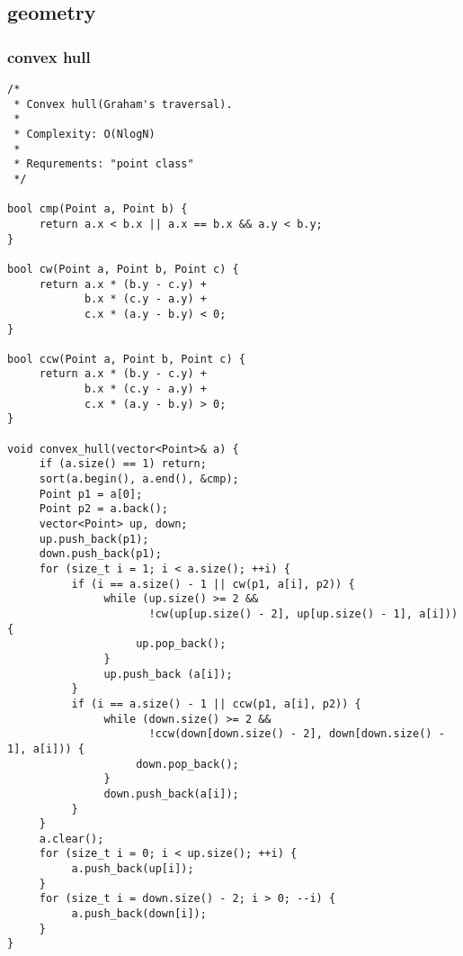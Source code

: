 \subsection{geometry}
\subsubsection{convex hull}
\begin{lstlisting}
/*
 * Convex hull(Graham's traversal).
 *
 * Complexity: O(NlogN)
 *
 * Requrements: "point class"
 */

bool cmp(Point a, Point b) {
     return a.x < b.x || a.x == b.x && a.y < b.y;
}

bool cw(Point a, Point b, Point c) {
     return a.x * (b.y - c.y) +
            b.x * (c.y - a.y) +
            c.x * (a.y - b.y) < 0;
}

bool ccw(Point a, Point b, Point c) {
     return a.x * (b.y - c.y) +
            b.x * (c.y - a.y) +
            c.x * (a.y - b.y) > 0;
}

void convex_hull(vector<Point>& a) {
     if (a.size() == 1) return;
     sort(a.begin(), a.end(), &cmp);
     Point p1 = a[0];
     Point p2 = a.back();
     vector<Point> up, down;
     up.push_back(p1);
     down.push_back(p1);
     for (size_t i = 1; i < a.size(); ++i) {
          if (i == a.size() - 1 || cw(p1, a[i], p2)) {
               while (up.size() >= 2 &&
                      !cw(up[up.size() - 2], up[up.size() - 1], a[i])) {
                    up.pop_back();
               }
               up.push_back (a[i]);
          }
          if (i == a.size() - 1 || ccw(p1, a[i], p2)) {
               while (down.size() >= 2 &&
                      !ccw(down[down.size() - 2], down[down.size() - 1], a[i])) {
                    down.pop_back();
               }
               down.push_back(a[i]);
          }
     }
     a.clear();
     for (size_t i = 0; i < up.size(); ++i) {
          a.push_back(up[i]);
     }
     for (size_t i = down.size() - 2; i > 0; --i) {
          a.push_back(down[i]);
     }
}

\end{lstlisting}
